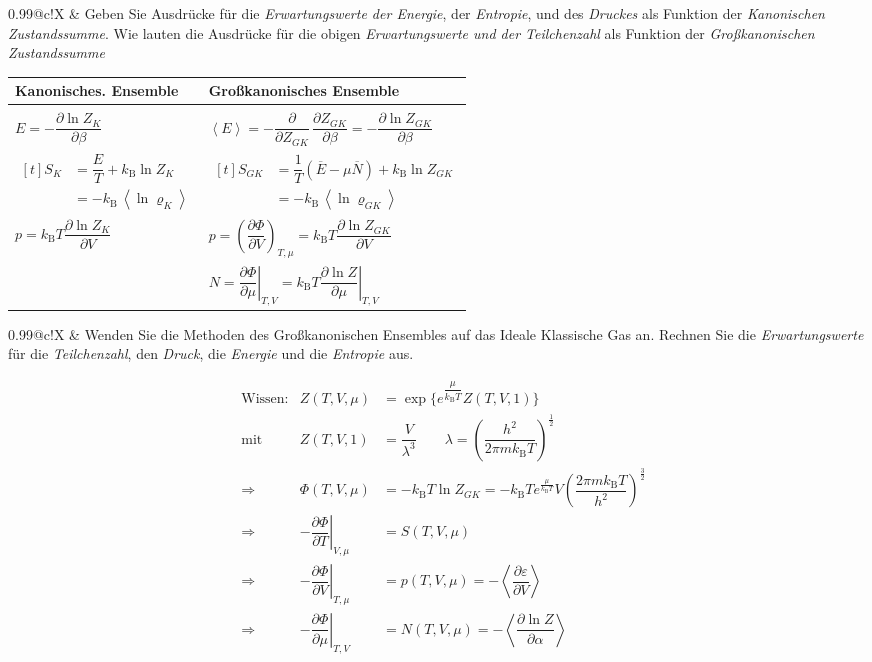 \documentclass[a4paper,12pt]{scrartcl}
\makeatletter
\def\dpf#1#2{\dfrac{\partial #1}{\partial #2}}		%
\def\kb#1{\left\langle #1\right\rangle}			%
\def\ol{\overline}					%
\def\kB{k_\mathrm{B}}					%
\newcounter{qc}\setcounter{qc}{1}
\newenvironment{fshaded}{
\def\FrameCommand{\fcolorbox{framecolor}{shadecolor}}
\MakeFramed {\FrameRestore}}
{\endMakeFramed}
\def\frage#1{
\begin{fshaded}
\noindent
\begin{tabularx}{0.99\textwidth}{@{}c!{\color{framecolor}\vline}X}
{ \bf \rm \theqc }	&	\noindent #1
\end{tabularx}
\stepcounter{qc}
\end{fshaded}
}
\makeatother
\begin{document}


\frage{Geben Sie Ausdrücke für die \textit{Erwartungswerte der Energie}, der \textit{Entropie}, und des \textit{Druckes} als 
Funktion der \textit{Kanonischen Zustandssumme}. Wie lauten die Ausdrücke für die obigen \textit{Erwartungswerte und der 
Teilchenzahl} als Funktion der \textit{Großkanonischen Zustandssumme}}
\noindent 
\begin{tabularx}{\textwidth}{@{}p{}|X}
\textbf{Kanonisches. Ensemble} & \textbf{Großkanonisches Ensemble}\\
\hline{}
\\
$E=-\dpf{\ln Z_K}{\beta}$ & $\kb E=-\dpf{}{Z_{GK}}\,\dpf{Z_{GK}}{\beta}=-\dpf{\ln Z_{GK}}{\beta}$\\
$\begin{aligned}[t] S_K&=\dfrac{E}{T}+\kB  \ln Z_K \\ &=-\kB \,\kb{\ln \varrho_K} \end{aligned}$ & 
$\begin{aligned}[t] S_{GK}&=\dfrac{1}{T}(\ol{E}-\mu \ol{N})+\kB  \ln Z_{GK}\\ &=-\kB \,\kb{\ln \varrho_{GK}} \end{aligned}$ 
\\
$p= \kB  T \dpf{\ln Z_K}{V}$ & $p= \left( \dpf{\Phi}{V} \right)_{T,\mu}=\kB  T \dpf{\ln Z_{GK}}{V}$\\
& $N=\left.\dpf{\Phi}{\mu}\right|_{T,V}=\kB  T \left.\dpf{\ln Z}{\mu}\right|_{T,V}$
\end{tabularx}



\frage{Wenden Sie die Methoden des Großkanonischen Ensembles auf das Ideale Klassische Gas an. Rechnen Sie die 
\textit{Erwartungswerte} für die \textit{Teilchenzahl}, den \textit{Druck}, die \textit{Energie} und die \textit{Entropie} 
aus.}
\noindent
\begin{align*}
&\text{Wissen:} &Z(T,V,\mu)&=\exp \{e^{ \dfrac{\mu}{\kB  T} } Z(T,V,1) \} \\
&\text{mit} &Z(T,V,1)&=\dfrac{V}{\lambda^3} \qquad \lambda=\left( \dfrac{h^2}{2 \pi m \kB  T} \right)^{\frac{1}{2}}\\
&\Rightarrow &\Phi(T,V,\mu)&=-\kB  T \ln Z_{GK} = -\kB  T e^{ \frac{\mu}{\kB  T} } V  \left( \dfrac{2 \pi m \kB  T}{h^2} 
\right)^{\frac{3}{2}} \\
&\Rightarrow &-\left.\dpf{\Phi}{T} \right|_{V,\mu} &= S(T,V,\mu)\\
&\Rightarrow &-\left.\dpf{\Phi}{V} \right|_{T,\mu} &= p(T,V,\mu)=-\kb{ \dpf{\varepsilon}{V} } \\
&\Rightarrow &-\left.\dpf{\Phi}{\mu} \right|_{T,V} &= N(T,V,\mu)=-\kb{ \dpf{\ln Z}{\alpha} } \\
\end{align*}
\end{document}
